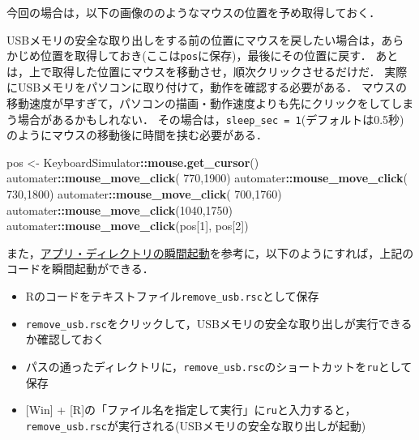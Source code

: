 \documentclass[
]{article}
\newenvironment{Shaded}{\begin{snugshade}}{\end{snugshade}}
\newcommand{\DecValTok}[1]{\textcolor[rgb]{0.00,0.00,0.81}{#1}}
\newcommand{\FunctionTok}[1]{\textcolor[rgb]{0.13,0.29,0.53}{\textbf{#1}}}
\newcommand{\NormalTok}[1]{#1}
\newcommand{\OtherTok}[1]{\textcolor[rgb]{0.56,0.35,0.01}{#1}}
\newcommand{\SpecialCharTok}[1]{\textcolor[rgb]{0.81,0.36,0.00}{\textbf{#1}}}
\providecommand{\tightlist}{%
  \setlength{\itemsep}{0pt}\setlength{\parskip}{0pt}}
\begin{document}
今回の場合は，以下の画像ののようなマウスの位置を予め取得しておく．

USBメモリの安全な取り出しをする前の位置にマウスを戻したい場合は，あらかじめ位置を取得しておき(ここは\texttt{pos}に保存)，最後にその位置に戻す．
あとは，上で取得した位置にマウスを移動させ，順次クリックさせるだけだ．
実際にUSBメモリをパソコンに取り付けて，動作を確認する必要がある．
マウスの移動速度が早すぎて，パソコンの描画・動作速度よりも先にクリックをしてしまう場合があるかもしれない．
その場合は，\texttt{sleep\_sec\ =\ 1}(デフォルトは0.5秒)のようにマウスの移動後に時間を挟む必要がある．

\begin{Shaded}
\begin{Highlighting}[]
\NormalTok{pos }\OtherTok{\textless{}{-}}\NormalTok{ KeyboardSimulator}\SpecialCharTok{::}\FunctionTok{mouse.get\_cursor}\NormalTok{()}
\NormalTok{automater}\SpecialCharTok{::}\FunctionTok{mouse\_move\_click}\NormalTok{( }\DecValTok{770}\NormalTok{,}\DecValTok{1900}\NormalTok{)}
\NormalTok{automater}\SpecialCharTok{::}\FunctionTok{mouse\_move\_click}\NormalTok{( }\DecValTok{730}\NormalTok{,}\DecValTok{1800}\NormalTok{)}
\NormalTok{automater}\SpecialCharTok{::}\FunctionTok{mouse\_move\_click}\NormalTok{( }\DecValTok{700}\NormalTok{,}\DecValTok{1760}\NormalTok{)}
\NormalTok{automater}\SpecialCharTok{::}\FunctionTok{mouse\_move\_click}\NormalTok{(}\DecValTok{1040}\NormalTok{,}\DecValTok{1750}\NormalTok{)}
\NormalTok{automater}\SpecialCharTok{::}\FunctionTok{mouse\_move\_click}\NormalTok{(pos[}\DecValTok{1}\NormalTok{], pos[}\DecValTok{2}\NormalTok{])}
\end{Highlighting}
\end{Shaded}

また，\protect\hyperlink{run_inux5cux2520a_second}{アプリ・ディレクトリの瞬間起動}を参考に，以下のようにすれば，上記のコードを瞬間起動ができる．

\begin{itemize}
\tightlist
\item
  Rのコードをテキストファイル\texttt{remove\_usb.rsc}として保存\\
\item
  \texttt{remove\_usb.rsc}をクリックして，USBメモリの安全な取り出しが実行できるか確認しておく\\
\item
  パスの通ったディレクトリに，\texttt{remove\_usb.rsc}のショートカットを\texttt{ru}として保存\\
\item
  {[}Win{]} + {[}R{]}の「ファイル名を指定して実行」に\texttt{ru}と入力すると，\texttt{remove\_usb.rsc}が実行される(USBメモリの安全な取り出しが起動)
\end{itemize}
\end{document}
